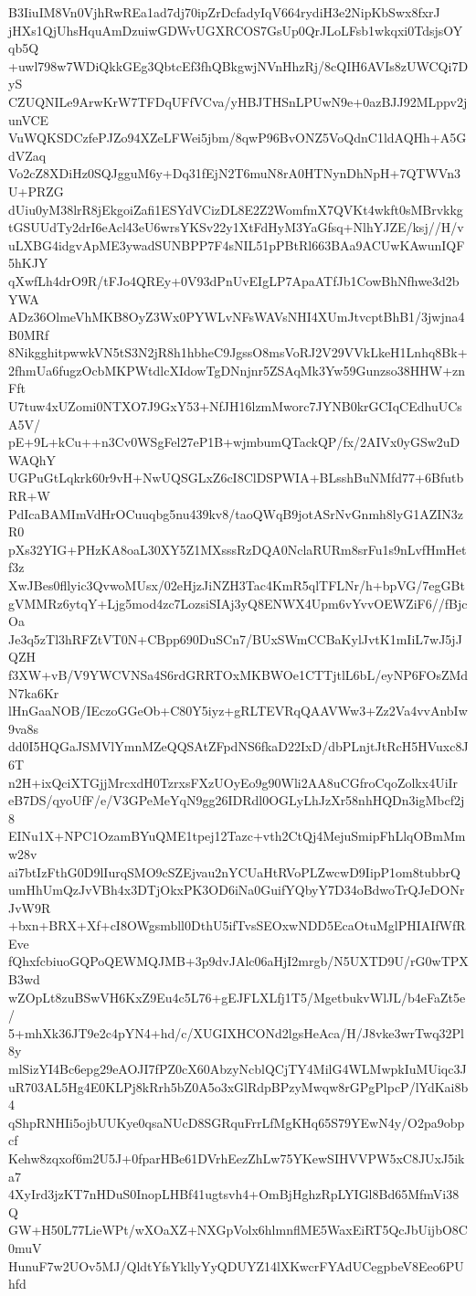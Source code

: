 B3IiuIM8Vn0VjhRwREa1ad7dj70ipZrDcfadyIqV664rydiH3e2NipKbSwx8fxrJ
jHXs1QjUhsHquAmDzuiwGDWvUGXRCOS7GsUp0QrJLoLFsb1wkqxi0TdsjsOYqb5Q
+uwl798w7WDiQkkGEg3QbtcEf3fhQBkgwjNVnHhzRj/8cQIH6AVIs8zUWCQi7DyS
CZUQNILe9ArwKrW7TFDqUFfVCva/yHBJTHSnLPUwN9e+0azBJJ92MLppv2junVCE
VuWQKSDCzfePJZo94XZeLFWei5jbm/8qwP96BvONZ5VoQdnC1ldAQHh+A5GdVZaq
Vo2cZ8XDiHz0SQJgguM6y+Dq31fEjN2T6muN8rA0HTNynDhNpH+7QTWVn3U+PRZG
dUiu0yM38lrR8jEkgoiZafi1ESYdVCizDL8E2Z2WomfmX7QVKt4wkft0sMBrvkkg
tGSUUdTy2drI6eAcl43eU6wrsYKSv22y1XtFdHyM3YaGfsq+NlhYJZE/ksj//H/v
uLXBG4idgvApME3ywadSUNBPP7F4sNIL51pPBtRl663BAa9ACUwKAwunIQF5hKJY
qXwfLh4drO9R/tFJo4QREy+0V93dPnUvEIgLP7ApaATfJb1CowBhNfhwe3d2bYWA
ADz36OlmeVhMKB8OyZ3Wx0PYWLvNFsWAVsNHI4XUmJtvcptBhB1/3jwjna4B0MRf
8NikgghitpwwkVN5tS3N2jR8h1hbheC9JgssO8msVoRJ2V29VVkLkeH1Lnhq8Bk+
2fhmUa6fugzOcbMKPWtdlcXIdowTgDNnjnr5ZSAqMk3Yw59Gunzso38HHW+znFft
U7tuw4xUZomi0NTXO7J9GxY53+NfJH16lzmMworc7JYNB0krGCIqCEdhuUCsA5V/
pE+9L+kCu++n3Cv0WSgFel27eP1B+wjmbumQTackQP/fx/2AIVx0yGSw2uDWAQhY
UGPuGtLqkrk60r9vH+NwUQSGLxZ6cI8ClDSPWIA+BLsshBuNMfd77+6BfutbRR+W
PdIcaBAMImVdHrOCuuqbg5nu439kv8/taoQWqB9jotASrNvGnmh8lyG1AZIN3zR0
pXs32YIG+PHzKA8oaL30XY5Z1MXsssRzDQA0NclaRURm8srFu1s9nLvfHmHetf3z
XwJBes0fllyic3QvwoMUsx/02eHjzJiNZH3Tac4KmR5qlTFLNr/h+bpVG/7egGBt
gVMMRz6ytqY+Ljg5mod4zc7LozsiSIAj3yQ8ENWX4Upm6vYvvOEWZiF6//fBjcOa
Je3q5zTl3hRFZtVT0N+CBpp690DuSCn7/BUxSWmCCBaKylJvtK1mIiL7wJ5jJQZH
f3XW+vB/V9YWCVNSa4S6rdGRRTOxMKBWOe1CTTjtlL6bL/eyNP6FOsZMdN7ka6Kr
lHnGaaNOB/IEczoGGeOb+C80Y5iyz+gRLTEVRqQAAVWw3+Zz2Va4vvAnbIw9va8s
dd0I5HQGaJSMVlYmnMZeQQSAtZFpdNS6fkaD22IxD/dbPLnjtJtRcH5HVuxc8J6T
n2H+ixQciXTGjjMrcxdH0TzrxsFXzUOyEo9g90Wli2AA8uCGfroCqoZolkx4UiIr
eB7DS/qyoUfF/e/V3GPeMeYqN9gg26IDRdl0OGLyLhJzXr58nhHQDn3igMbcf2j8
EINu1X+NPC1OzamBYuQME1tpej12Tazc+vth2CtQj4MejuSmipFhLlqOBmMmw28v
ai7btIzFthG0D9lIurqSMO9cSZEjvau2nYCUaHtRVoPLZwcwD9IipP1om8tubbrQ
umHhUmQzJvVBh4x3DTjOkxPK3OD6iNa0GuifYQbyY7D34oBdwoTrQJeDONrJvW9R
+bxn+BRX+Xf+cI8OWgsmbll0DthU5ifTvsSEOxwNDD5EcaOtuMglPHIAIfWfREve
fQhxfcbiuoGQPoQEWMQJMB+3p9dvJAlc06aHjI2mrgb/N5UXTD9U/rG0wTPXB3wd
wZOpLt8zuBSwVH6KxZ9Eu4c5L76+gEJFLXLfj1T5/MgetbukvWlJL/b4eFaZt5e/
5+mhXk36JT9e2c4pYN4+hd/c/XUGIXHCONd2lgsHeAca/H/J8vke3wrTwq32Pl8y
mlSizYI4Bc6epg29eAOJI7fPZ0cX60AbzyNcblQCjTY4MilG4WLMwpkIuMUiqc3J
uR703AL5Hg4E0KLPj8kRrh5bZ0A5o3xGlRdpBPzyMwqw8rGPgPlpcP/lYdKai8b4
qShpRNHIi5ojbUUKye0qsaNUcD8SGRquFrrLfMgKHq65S79YEwN4y/O2pa9obpcf
Kehw8zqxof6m2U5J+0fparHBe61DVrhEezZhLw75YKewSIHVVPW5xC8JUxJ5ika7
4XyIrd3jzKT7nHDuS0InopLHBf41ugtsvh4+OmBjHghzRpLYIGl8Bd65MfmVi38Q
GW+H50L77LieWPt/wXOaXZ+NXGpVolx6hlmnflME5WaxEiRT5QcJbUijbO8C0muV
HunuF7w2UOv5MJ/QldtYfsYkllyYyQDUYZ14lXKwcrFYAdUCegpbeV8Eeo6PUhfd
